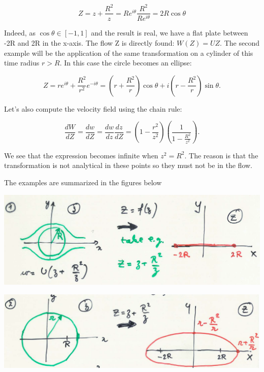 		\begin{equation}
		Z = z + \frac{R^2}{z} = Re^{i\theta}  \frac{R^2}{Re^{i\theta}} = 2 R \cos \theta 
		\end{equation}
		
		Indeed, as $\cos \theta \in [-1,1]$ and the result is real, we have a flat plate between -2R and 2R in the x-axis. The flow Z is directly found: $W(Z) = UZ$. The second example will be the application of the same transformation on a cylinder of this time radius $r>R$. In this case the circle becomes an ellipse:
		
		\begin{equation}
		Z = r e^{i\theta} + \frac{R^2}{r^2}e^{-i\theta} = \left( r + \frac{R^2}{r} \right)\cos \theta + i \left( r - \frac{R^2}{r} \right) \sin \theta.
		\end{equation}		 
		
		Let's also compute the velocity field using the chain rule:
		
		\begin{equation}
		\frac{dW}{dZ} = \frac{dw}{dZ} = \frac{dw}{dz}\frac{dz}{dZ} = \left( 1 -\frac{r^2}{z^2} \right) \left( \frac{1}{1-\frac{R^2}{z^2}} \right).
		\end{equation}
		
		We see that the expression becomes infinite when $z^2 = R^2$. The reason is that the transformation is not analytical in these points so they must not be in the flow. 
		
		The examples are summarized in the figures below 
		
		\begin{center}
		\begin{minipage}{0.45\textwidth}
		\includegraphics[scale=0.25]{ch2/29}
		\end{minipage}
		\begin{minipage}{0.45\textwidth}
		\includegraphics[scale=0.3]{ch2/30}
		\end{minipage}
		\end{center}
		

